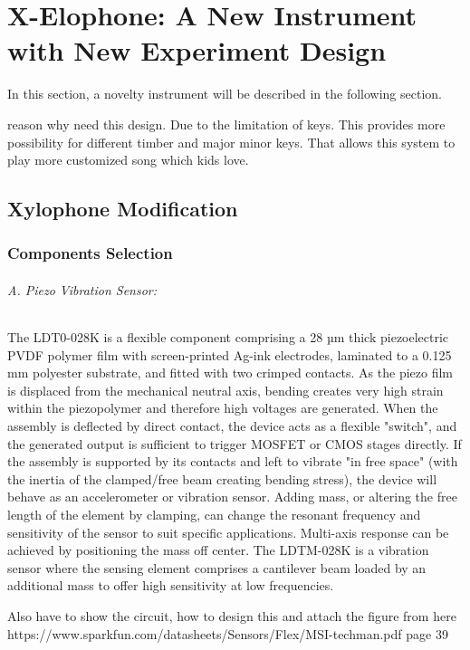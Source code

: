 \chapter{X-Elophone: A New Instrument with New Experiment Design}
In this section, a novelty instrument will be described in the following section.

reason why need this design. Due to the limitation of keys. This provides more 
possibility for different timber and major minor keys. That allows this system to 
play more customized song which kids love.

\section{Xylophone Modification}

\subsection{Components Selection}

\subparagraph{A. Piezo Vibration Sensor: }
The LDT0-028K is a flexible component comprising a 28 µm thick piezoelectric PVDF
polymer film with screen-printed Ag-ink electrodes, laminated to a 0.125 mm polyester 
substrate, and fitted with two crimped contacts. As the piezo film is displaced from 
the mechanical neutral axis, bending creates very high strain within the piezopolymer 
and therefore high voltages are generated. When the assembly is deflected by direct 
contact, the device acts as a flexible "switch", and the generated output is sufficient 
to trigger MOSFET or CMOS stages directly. If the assembly is supported by its contacts 
and left to vibrate "in free space" (with the inertia of the clamped/free beam creating 
bending stress), the device will behave as an accelerometer or vibration sensor. Adding 
mass, or altering the free length of the element by clamping, can change the resonant 
frequency and sensitivity of the sensor to suit specific applications. Multi-axis response 
can be achieved by positioning the mass off center. The LDTM-028K is a vibration sensor 
where the sensing element comprises a cantilever beam loaded by an additional mass to 
offer high sensitivity at low frequencies. 

Also have to show the circuit, how to design this and attach the figure from here
https://www.sparkfun.com/datasheets/Sensors/Flex/MSI-techman.pdf
page 39

